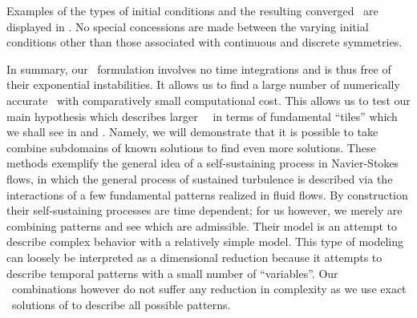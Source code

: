 


Examples of the types of initial conditions and the resulting converged \twots\
are displayed in . No special concessions
are made between the varying initial conditions other than those associated
with continuous and discrete symmetries.

In summary, our \spt\ formulation involves no time integrations and is
thus free of their exponential instabilities. It allows us to
find a large number of numerically accurate \twots\
with comparatively small computational cost.
This allows
us to test our main hypothesis which describes larger \spt\ \twots\
in terms of fundamental ``tiles'' which we shall see in 
and . Namely, we will demonstrate that it is possible to
take combine subdomains of known solutions to find even more solutions.
These methods exemplify the general idea of a self-sustaining process
in Navier-Stokes flows, in which the general process of sustained
turbulence is described via the interactions of a few fundamental
patterns realized in fluid flows\rf{W97}. By construction their
self-sustaining processes are time dependent; for us however, we
merely are combining patterns and see which are admissible.
Their model is an attempt to describe complex behavior with a
relatively simple model.
This type of modeling can loosely
be interpreted as a dimensional reduction because it attempts
to describe temporal patterns with a small number of ``variables''.
Our \spt\ combinations however do not suffer any reduction in complexity
as we use exact \spt\ solutions of \refeq{e-ks} to describe
all possible patterns.
